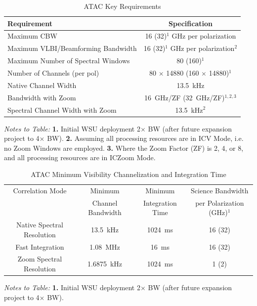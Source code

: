 \begin{table}[h]
    \centering
    \caption{\ac{ATAC} Key Requirements \cite{atac_sdd_dd-1} \cite{atac_spe_ds-1}}
    \begin{tabular}{lc}
         \hline
         Requirement & Specification \\
         \hline
         Maximum \ac{CBW} & 16 (32)$^1$ GHz per polarization \\
         Maximum VLBI/Beamforming Bandwidth & 16 (32)$^1$ GHz per polarization$^2$\\
         Maximum Number of Spectral Windows & 80 (160)$^1$ \\
         Number of Channels (per pol) & 80 $\times$ 14880 (160 $\times$ 14880)$^1$ \\
         Native Channel Width & 13.5~kHz \\
         Bandwidth with Zoom & 16~GHz/ZF (32~GHz/ZF)$^{1,2,3}$ \\
         Spectral Channel Width with Zoom & 13.5~kHz$^2$\\
         \hline
    \end{tabular}
    \begin{minipage}{\textwidth}
    \small
    \vspace*{0.5em}
        \textit{Notes to Table:} 
        \textbf{1.} Initial WSU deployment 2$\times$ BW  (after future expansion project to 4$\times$ BW). 
        \textbf{2.} Assuming all processing resources are in \ac{ICV} Mode, i.e. no Zoom Windows are employed. 
        \textbf{3.} Where the Zoom Factor (ZF) is 2, 4, or 8, and all processing resources are in \ac{ICZoom} Mode.
    \end{minipage}
    \label{tab:atac_req}
\end{table}

\begin{table}[h]
    \centering
    \caption{ATAC Minimum Visibility Channelization and Integration Time \cite{atac_sdd_dd-1}}
    \begin{tabular}{cccc}
         \hline
         Correlation Mode &  Minimum &  Minimum & Science Bandwidth \\
          &  Channel Bandwidth & Integration Time & per Polarization (GHz)$^1$ \\
         \hline
         Native Spectral Resolution &  13.5~kHz& 1024~ms & 16 (32) \\
         Fast Integration &  1.08~MHz & 16~ms & 16 (32) \\
         Zoom Spectral Resolution & 1.6875~kHz & 1024~ms & 1 (2) \\
         \hline
    \end{tabular}
    \begin{minipage}{0.96\textwidth}
    \small
    \vspace*{0.5em}
        \textit{Notes to Table:} 
        \textbf{1.} Initial WSU deployment 2$\times$ BW (after future expansion project  to 4$\times$ BW).
    \end{minipage}
    \label{tab:atac_CH_Tint}
\end{table}


